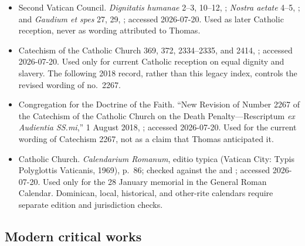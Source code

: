 \begin{itemize}
\item Second Vatican Council.  \emph{Dignitatis humanae} 2--3, 10--12,
;
\emph{Nostra aetate} 4--5,
; and
\emph{Gaudium et spes} 27, 29,
; accessed
2026-07-20.  Used as later Catholic reception, never as wording attributed to
Thomas.

\item Catechism of the Catholic Church 369, 372, 2334--2335, and 2414,
; accessed 2026-07-20.  Used only for current Catholic reception on
equal dignity and slavery.  The following 2018 record, rather than this legacy
index, controls the revised wording of no.~2267.

\item Congregation for the Doctrine of the Faith.  ``New Revision of Number
2267 of the Catechism of the Catholic Church on the Death Penalty---Rescriptum
\emph{ex Audientia SS.mi},'' 1 August 2018,
;
accessed 2026-07-20.  Used for the current wording of Catechism 2267, not as a
claim that Thomas anticipated it.

\item Catholic Church.  \emph{Calendarium Romanum}, editio typica (Vatican
City: Typis Polyglottis Vaticanis, 1969), p.~86; checked against the
 and
; accessed 2026-07-20.  Used only for the 28 January
memorial in the General Roman Calendar.  Dominican, local, historical, and
other-rite calendars require separate edition and jurisdiction checks.
\end{itemize}

\subsection{Modern critical works}

